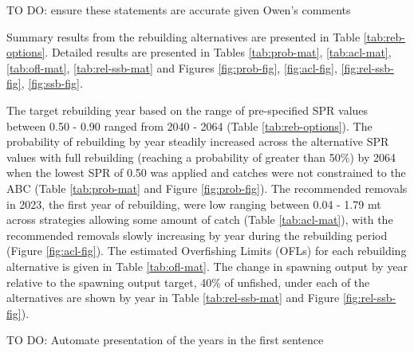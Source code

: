 \documentclass[11pt,
  english,
  a4paper,
]{article}
\begin{document}
\leavevmode\tagmcend\tagstructend


TO DO: ensure these statements are accurate given Owen's comments

\leavevmode\tagmcend\tagstructend\par


Summary results from the rebuilding alternatives are presented in Table \ref{tab:reb-options}. Detailed results are presented in Tables \ref{tab:prob-mat}, \ref{tab:acl-mat}, \ref{tab:ofl-mat}, \ref{tab:rel-ssb-mat} and Figures \ref{fig:prob-fig}, \ref{fig:acl-fig}, \ref{fig:rel-ssb-fig}, \ref{fig:ssb-fig}.

\leavevmode\tagmcend\tagstructend\par


The target rebuilding year based on the range of pre-specified SPR values between 0.50 - 0.90 ranged from 2040 - 2064 (Table \ref{tab:reb-options}). The probability of rebuilding by year steadily increased across the alternative SPR values with full rebuilding (reaching a probability of greater than 50\%) by 2064 when the lowest SPR of 0.50 was applied and catches were not constrained to the ABC (Table \ref{tab:prob-mat} and Figure \ref{fig:prob-fig}). The recommended removals in 2023, the first year of rebuilding, were low ranging between 0.04 - 1.79 mt across strategies allowing some amount of catch (Table \ref{tab:acl-mat}), with the recommended removals slowly increasing by year during the rebuilding period (Figure \ref{fig:acl-fig}). The estimated Overfishing Limits (OFLs) for each rebuilding alternative is given in Table \ref{tab:ofl-mat}. The change in spawning output by year relative to the spawning output target, 40\% of unfished, under each of the alternatives are shown by year in Table \ref{tab:rel-ssb-mat} and Figure \ref{fig:rel-ssb-fig}).

\leavevmode\tagmcend\tagstructend\par


TO DO: Automate presentation of the years in the first sentence

\leavevmode\tagmcend\tagstructend\par

\end{document}
